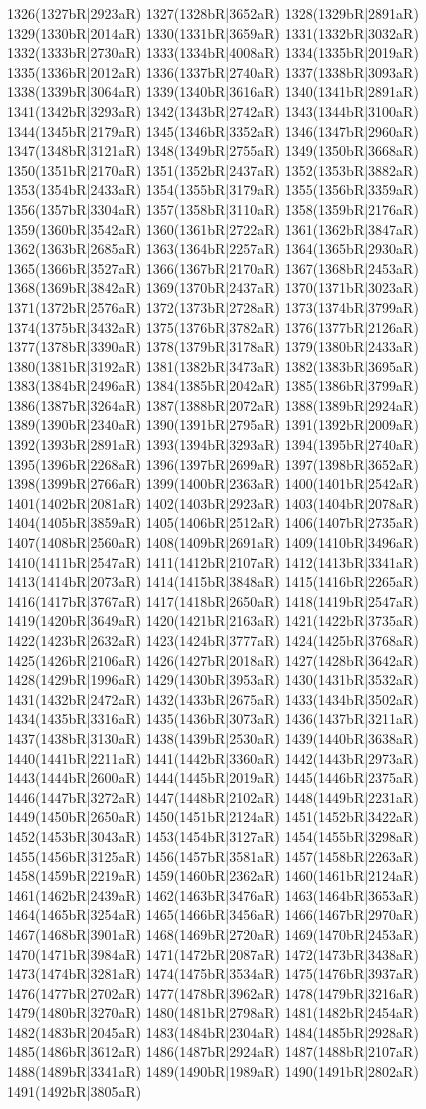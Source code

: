 1326(1327bR|2923aR) 1327(1328bR|3652aR) 1328(1329bR|2891aR) 1329(1330bR|2014aR) 1330(1331bR|3659aR) 1331(1332bR|3032aR) 1332(1333bR|2730aR) 1333(1334bR|4008aR) 1334(1335bR|2019aR) 1335(1336bR|2012aR) 1336(1337bR|2740aR) 1337(1338bR|3093aR) 1338(1339bR|3064aR) 1339(1340bR|3616aR) 1340(1341bR|2891aR) 1341(1342bR|3293aR) 1342(1343bR|2742aR) 1343(1344bR|3100aR) 1344(1345bR|2179aR) 1345(1346bR|3352aR) 1346(1347bR|2960aR) 1347(1348bR|3121aR) 1348(1349bR|2755aR) 1349(1350bR|3668aR) 1350(1351bR|2170aR) 1351(1352bR|2437aR) 1352(1353bR|3882aR) 1353(1354bR|2433aR) 1354(1355bR|3179aR) 1355(1356bR|3359aR) 1356(1357bR|3304aR) 1357(1358bR|3110aR) 1358(1359bR|2176aR) 1359(1360bR|3542aR) 1360(1361bR|2722aR) 1361(1362bR|3847aR) 1362(1363bR|2685aR) 1363(1364bR|2257aR) 1364(1365bR|2930aR) 1365(1366bR|3527aR) 1366(1367bR|2170aR) 1367(1368bR|2453aR) 1368(1369bR|3842aR) 1369(1370bR|2437aR) 1370(1371bR|3023aR) 1371(1372bR|2576aR) 1372(1373bR|2728aR) 1373(1374bR|3799aR) 1374(1375bR|3432aR) 1375(1376bR|3782aR) 1376(1377bR|2126aR) 1377(1378bR|3390aR) 1378(1379bR|3178aR) 1379(1380bR|2433aR) 1380(1381bR|3192aR) 1381(1382bR|3473aR) 1382(1383bR|3695aR) 1383(1384bR|2496aR) 1384(1385bR|2042aR) 1385(1386bR|3799aR) 1386(1387bR|3264aR) 1387(1388bR|2072aR) 1388(1389bR|2924aR) 1389(1390bR|2340aR) 1390(1391bR|2795aR) 1391(1392bR|2009aR) 1392(1393bR|2891aR) 1393(1394bR|3293aR) 1394(1395bR|2740aR) 1395(1396bR|2268aR) 1396(1397bR|2699aR) 1397(1398bR|3652aR) 1398(1399bR|2766aR) 1399(1400bR|2363aR) 1400(1401bR|2542aR) 1401(1402bR|2081aR) 1402(1403bR|2923aR) 1403(1404bR|2078aR) 1404(1405bR|3859aR) 1405(1406bR|2512aR) 1406(1407bR|2735aR) 1407(1408bR|2560aR) 1408(1409bR|2691aR) 1409(1410bR|3496aR) 1410(1411bR|2547aR) 1411(1412bR|2107aR) 1412(1413bR|3341aR) 1413(1414bR|2073aR) 1414(1415bR|3848aR) 1415(1416bR|2265aR) 1416(1417bR|3767aR) 1417(1418bR|2650aR) 1418(1419bR|2547aR) 1419(1420bR|3649aR) 1420(1421bR|2163aR) 1421(1422bR|3735aR) 1422(1423bR|2632aR) 1423(1424bR|3777aR) 1424(1425bR|3768aR) 1425(1426bR|2106aR) 1426(1427bR|2018aR) 1427(1428bR|3642aR) 1428(1429bR|1996aR) 1429(1430bR|3953aR) 1430(1431bR|3532aR) 1431(1432bR|2472aR) 1432(1433bR|2675aR) 1433(1434bR|3502aR) 1434(1435bR|3316aR) 1435(1436bR|3073aR) 1436(1437bR|3211aR) 1437(1438bR|3130aR) 1438(1439bR|2530aR) 1439(1440bR|3638aR) 1440(1441bR|2211aR) 1441(1442bR|3360aR) 1442(1443bR|2973aR) 1443(1444bR|2600aR) 1444(1445bR|2019aR) 1445(1446bR|2375aR) 1446(1447bR|3272aR) 1447(1448bR|2102aR) 1448(1449bR|2231aR) 1449(1450bR|2650aR) 1450(1451bR|2124aR) 1451(1452bR|3422aR) 1452(1453bR|3043aR) 1453(1454bR|3127aR) 1454(1455bR|3298aR) 1455(1456bR|3125aR) 1456(1457bR|3581aR) 1457(1458bR|2263aR) 1458(1459bR|2219aR) 1459(1460bR|2362aR) 1460(1461bR|2124aR) 1461(1462bR|2439aR) 1462(1463bR|3476aR) 1463(1464bR|3653aR) 1464(1465bR|3254aR) 1465(1466bR|3456aR) 1466(1467bR|2970aR) 1467(1468bR|3901aR) 1468(1469bR|2720aR) 1469(1470bR|2453aR) 1470(1471bR|3984aR) 1471(1472bR|2087aR) 1472(1473bR|3438aR) 1473(1474bR|3281aR) 1474(1475bR|3534aR) 1475(1476bR|3937aR) 1476(1477bR|2702aR) 1477(1478bR|3962aR) 1478(1479bR|3216aR) 1479(1480bR|3270aR) 1480(1481bR|2798aR) 1481(1482bR|2454aR) 1482(1483bR|2045aR) 1483(1484bR|2304aR) 1484(1485bR|2928aR) 1485(1486bR|3612aR) 1486(1487bR|2924aR) 1487(1488bR|2107aR) 1488(1489bR|3341aR) 1489(1490bR|1989aR) 1490(1491bR|2802aR) 1491(1492bR|3805aR) 